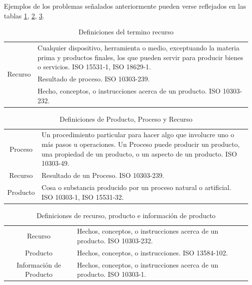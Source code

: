 \documentclass[journal]{IEEEtran}
\begin{document}
Ejemplos de los problemas se\~{n}alados anteriormente pueden verse reflejados en las tablas \ref{tabla1}, \ref{tabla2}, \ref{tabla3}. 

\begin{table}[!t]
\renewcommand{\arraystretch}{1.3}
\caption{Definiciones del termino recurso}
\label{tabla1}
\centering
\begin{tabular}{cp{6cm}}
\hline
\hline
\multirow{3}{*}{Recurso} & Cualquier dispositivo, herramienta o medio, exceptuando la materia prima y productos finales, los que pueden servir para producir bienes o servicios. ISO 15531-1, ISO 18629-1.\\ \cline{2-2}
                         & Resultado de proceso. ISO 10303-239.\\ \cline{2-2}
                         & Hecho, conceptos, o instrucciones acerca de un producto. ISO 10303-232. \\  \hline \hline                                                                                                    
\end{tabular}
\end{table}

\begin{table}[!t]
\renewcommand{\arraystretch}{1.3}
\caption{Definiciones de Producto, Proceso y Recurso}
\label{tabla2}
\centering
\begin{tabular}{cp{6cm}}
\hline
\hline
Proceso & Un procedimiento particular para hacer algo que involucre uno o m\'as pasos u operaciones. Un Proceso puede producir un producto, una propiedad de un producto, o un aspecto de un producto. ISO 10303-49.\\ \cline{1-2}
Recurso                         & Resultado de un Proceso. ISO 10303-239.\\ \cline{1-2}
Producto                         & Cosa o substancia producido por un proceso natural o artificial. ISO 10303-1, ISO 15531-32. \\  \hline \hline                                                                                                    
\end{tabular}
\end{table}

\begin{table}[!t]
\renewcommand{\arraystretch}{1.3}
\caption{Definiciones de recurso, producto e informaci\'on de producto}
\label{tabla3}
\centering
\begin{tabular}{cp{4cm}}
\hline
\hline
Recurso & Hechos, conceptos, o instrucciones acerca de un producto. ISO 10303-232.\\ \cline{1-2}
Producto & Hechos, conceptos, o instrucciones. ISO 13584-102.\\ \cline{1-2}
Informaci\'on de Producto & Hechos, conceptos, o instrucciones acerca de un producto. ISO 10303-1. \\  \hline \hline                                                                                                    
\end{tabular}
\end{table}
\end{document}
